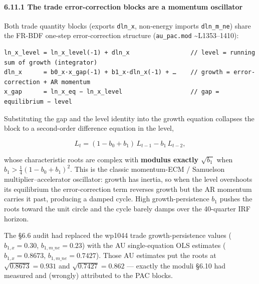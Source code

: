 \documentclass[
]{article}
\begin{document}
\paragraph{6.11.1 The trade error-correction blocks are a momentum
oscillator}\label{the-trade-error-correction-blocks-are-a-momentum-oscillator}

Both trade quantity blocks (exports \texttt{dln\_x}, non-energy imports
\texttt{dln\_m\_ne}) share the FR-BDF one-step error-correction
structure (\texttt{au\_pac.mod} \textasciitilde L1353--1410):

\begin{verbatim}
ln_x_level = ln_x_level(-1) + dln_x                 // level = running sum of growth (integrator)
dln_x      = b0_x·x_gap(-1) + b1_x·dln_x(-1) + …    // growth = error-correction + AR momentum
x_gap      = ln_x_eq − ln_x_level                   // gap = equilibrium − level
\end{verbatim}

Substituting the gap and the level identity into the growth equation
collapses the block to a second-order difference equation in the level,

\[ L_t = (1 - b_0 + b_1)\,L_{t-1} - b_1\,L_{t-2}, \]

whose characteristic roots are complex with \textbf{modulus exactly
\(\sqrt{b_1}\)} when \(b_1 > \tfrac14(1-b_0+b_1)^2\). This is the
classic momentum-ECM / Samuelson multiplier--accelerator oscillator:
growth has inertia, so when the level overshoots its equilibrium the
error-correction term reverses growth but the AR momentum carries it
past, producing a damped cycle. High growth-persistence \(b_1\) pushes
the roots toward the unit circle and the cycle barely damps over the
40-quarter IRF horizon.

The §6.6 audit had replaced the wp1044 trade growth-persistence values
(\(b_{1,x} = 0.30\), \(b_{1,m\_ne} = 0.23\)) with the AU single-equation
OLS estimates (\(b_{1,x} = 0.8673\), \(b_{1,m\_ne} = 0.7427\)). Those AU
estimates put the roots at \(\sqrt{0.8673} = 0.931\) and
\(\sqrt{0.7427} = 0.862\) --- exactly the moduli §6.10 had measured and
(wrongly) attributed to the PAC blocks.
\end{document}
